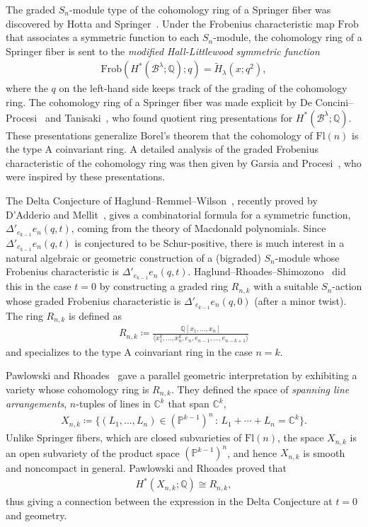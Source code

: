 \documentclass[submission]{FPSAC2021}
\theoremstyle{plain}
\numberwithin{equation}{section}
\newcommand{\bC}{\mathbb{C}}
\newcommand{\bP}{\mathbb{P}}
\newcommand{\bQ}{\mathbb{Q}}
\newcommand{\cB}{\mathcal{B}}
\newcommand{\st}{\,:\,}
\newcommand{\Fl}{\mathrm{Fl}}
\newcommand{\Frob}{\mathrm{Frob}}
\begin{document}
The graded $S_n$-module type of the cohomology ring of a Springer fiber was discovered by Hotta and Springer~\cite{Hotta-Springer}. Under the Frobenius characteristic map $\Frob$ that associates a symmetric function to each $S_n$-module, the cohomology ring of a Springer fiber is sent to the \emph{modified Hall-Littlewood symmetric function}
\begin{align}
\Frob(H^*(\cB^\lambda;\bQ);q) = \widetilde H_\lambda(x;q^2),
\end{align}
where the $q$ on the left-hand side keeps track of the grading of the cohomology ring. The cohomology ring of a Springer fiber was made explicit by De Concini--Procesi~\cite{dCP} and Tanisaki~\cite{Tanisaki}, who found quotient ring presentations for $H^*(\cB^\lambda;\bQ)$. These presentations generalize Borel's theorem that the cohomology of $\Fl(n)$ is the type A coinvariant ring.
A detailed analysis of the graded Frobenius characteristic of the cohomology ring was then given by Garsia and Procesi~\cite{Garsia-Procesi}, who were inspired by these presentations.

The Delta Conjecture of Haglund--Remmel--Wilson~\cite{HRW}, recently proved by D'Adderio and Mellit~\cite{DM}, gives a combinatorial formula for a symmetric function, $\Delta'_{e_{k-1}} e_n(q, t)$, coming from the theory of Macdonald polynomials. Since $\Delta'_{e_{k-1}} e_n(q,t)$ is conjectured to be Schur-positive, there is much interest in a natural algebraic or geometric construction of a (bigraded) $S_n$-module whose Frobenius characteristic is $\Delta'_{e_{k-1}} e_n(q,t)$. Haglund--Rhoades--Shimozono~\cite{HRS1} did this in the case $t=0$ by constructing a graded ring $R_{n,k}$ with a suitable $S_n$-action whose graded Frobenius characteristic is $\Delta'_{e_{k-1}} e_n(q, 0)$ (after a minor twist). The ring $R_{n,k}$ is defined as
\begin{align}
    R_{n,k}\coloneqq \frac{\bQ[x_1,\dots,x_n]}{\langle x_1^k,\dots, x_n^k,e_n,e_{n-1},\dots, e_{n-k+1}\rangle}
\end{align}
and specializes to the type A coinvariant ring in the case $n=k$. 

Pawlowski and Rhoades~\cite{Pawlowski-Rhoades} gave a parallel geometric interpretation by exhibiting a variety whose cohomology ring is $R_{n,k}$.  They defined the space of \emph{spanning line arrangements}, $n$-tuples of lines in $\bC^k$ that span $\bC^k$,
\begin{align}
X_{n,k} \coloneqq \{(L_1,\dots, L_n) \in (\bP^{k-1})^n \st L_1+\cdots +L_n = \bC^k\}.
\end{align}
Unlike Springer fibers, which are closed subvarieties of $\Fl(n)$, the space $X_{n,k}$ is an open subvariety of the product space $(\bP^{k-1})^n$, and hence $X_{n,k}$ is smooth and noncompact in general.
Pawlowski and Rhoades proved that 
\begin{align}
H^*(X_{n,k};\bQ) \cong R_{n,k},
\end{align}
thus giving a connection between the expression in the Delta Conjecture at $t=0$ and geometry. 
\end{document}

